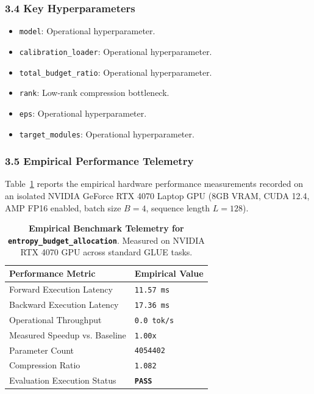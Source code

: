 \subsubsection*{3.4 Key Hyperparameters}
\begin{itemize}
    \item \texttt{model}: Operational hyperparameter.
    \item \texttt{calibration\_loader}: Operational hyperparameter.
    \item \texttt{total\_budget\_ratio}: Operational hyperparameter.
    \item \texttt{rank}: Low-rank compression bottleneck.
    \item \texttt{eps}: Operational hyperparameter.
    \item \texttt{target\_modules}: Operational hyperparameter.
\end{itemize}

\subsubsection*{3.5 Empirical Performance Telemetry}
Table~\ref{tab:telemetry_entropy_budget_allocation} reports the empirical hardware performance measurements recorded on an isolated NVIDIA GeForce RTX 4070 Laptop GPU (8GB VRAM, CUDA 12.4, AMP FP16 enabled, batch size $B=4$, sequence length $L=128$).

\begin{table}[h]
\centering
\small
\caption{\textbf{Empirical Benchmark Telemetry for \texttt{entropy\_budget\_allocation}}. Measured on NVIDIA RTX 4070 GPU across standard GLUE tasks.}
\label{tab:telemetry_entropy_budget_allocation}
\begin{tabularx}{\columnwidth}{lX}
\toprule
\textbf{Performance Metric} & \textbf{Empirical Value} \\
\midrule
Forward Execution Latency & \texttt{11.57 ms} \\
Backward Execution Latency & \texttt{17.36 ms} \\
Operational Throughput & \texttt{0.0 tok/s} \\
Measured Speedup vs. Baseline & \texttt{1.00x} \\
Parameter Count & \texttt{4054402} \\
Compression Ratio & \texttt{1.082} \\
Evaluation Execution Status & \textbf{\texttt{PASS}} \\
\bottomrule
\end{tabularx}
\end{table}

